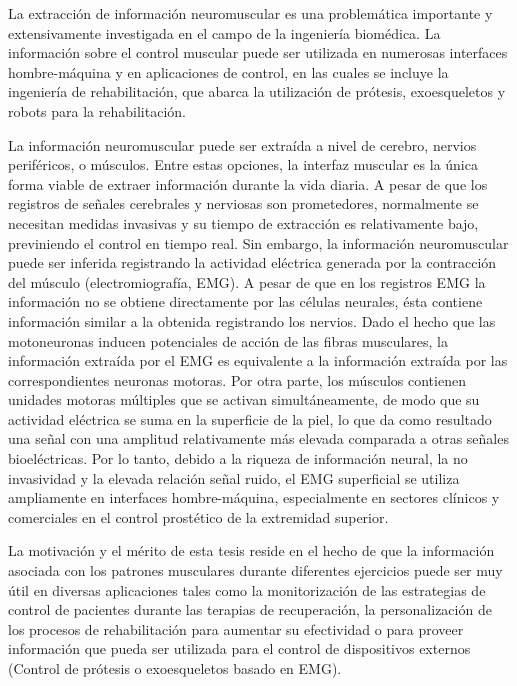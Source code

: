 \newpage

{}

\begin{resumen}

La extracción de información neuromuscular es una problemática importante y extensivamente investigada en el campo de la ingeniería biomédica. La información sobre el control muscular puede ser utilizada en numerosas interfaces hombre-máquina y en aplicaciones de control, en las cuales se incluye la ingeniería de rehabilitación, que abarca la utilización de prótesis, exoesqueletos y robots para la rehabilitación. 

La información neuromuscular puede ser extraída a nivel de cerebro, nervios periféricos, o músculos. Entre estas opciones, la interfaz muscular es la única forma viable de extraer información durante la vida diaria. A pesar de que los registros de señales cerebrales y nerviosas son prometedores, normalmente se necesitan medidas invasivas y su tiempo de extracción es relativamente bajo, previniendo el control en tiempo real. Sin embargo, la información neuromuscular puede ser inferida registrando la actividad eléctrica generada por la contracción del músculo (electromiografía, EMG). A pesar de que en los registros EMG la información no se obtiene directamente por las células neurales, ésta contiene información similar a la obtenida registrando los nervios. Dado el hecho que las motoneuronas inducen potenciales de acción de las fibras musculares, la información extraída por el EMG es equivalente a la información extraída por las correspondientes neuronas motoras. Por otra parte, los músculos contienen unidades motoras múltiples que se activan simultáneamente, de modo que su actividad eléctrica se suma en la superficie de la piel, lo que da como resultado una señal con una amplitud relativamente más elevada comparada a otras señales bioeléctricas. Por lo tanto, debido a la riqueza de información neural, la no invasividad y la elevada relación señal ruido, el EMG superficial se utiliza ampliamente en interfaces hombre-máquina, especialmente en sectores clínicos y comerciales en el control prostético de la extremidad superior. 

La motivación y el mérito de esta tesis reside en el hecho de que la información asociada con los patrones musculares durante diferentes ejercicios puede ser muy útil en diversas aplicaciones tales como la monitorización de las estrategias de control de pacientes durante las terapias de recuperación, la personalización de los procesos de rehabilitación para aumentar su efectividad o para proveer información que pueda ser utilizada para el control de dispositivos externos (Control de prótesis o exoesqueletos basado en EMG). 


\end{resumen}
